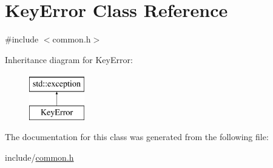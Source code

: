 \hypertarget{classKeyError}{}\section{Key\+Error Class Reference}
\label{classKeyError}


{\ttfamily \#include $<$common.\+h$>$}

Inheritance diagram for Key\+Error\+:\begin{figure}[H]
\begin{center}
\leavevmode
\includegraphics[height=2.000000cm]{classKeyError}
\end{center}
\end{figure}


The documentation for this class was generated from the following file\+:\begin{DoxyCompactItemize}
\item 
include/\hyperlink{common_8h}{common.\+h}\end{DoxyCompactItemize}
